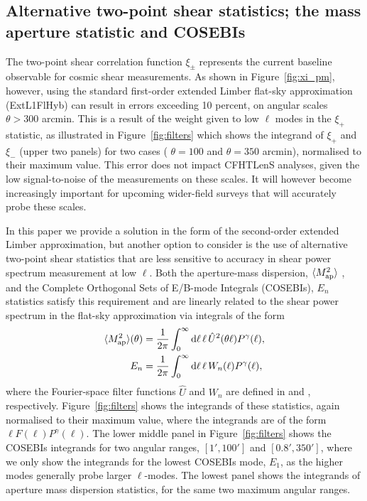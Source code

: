 \subsection{Alternative two-point shear statistics; the mass aperture statistic
and COSEBIs}

The two-point shear correlation function $\xi_\pm$ represents the current
baseline observable for cosmic shear measurements.   As shown in
Figure~\ref{fig:xi_pm}, however, using the standard first-order extended
Limber flat-sky approximation (ExtL1FlHyb) can result in errors exceeding 10
percent, on angular scales $\theta > 300$ arcmin.    This is a result of the
weight given to low $\ell$ modes in the $\xi_+$ statistic, as
illustrated in Figure~\ref{fig:filters} which shows the integrand of $\xi_+$
and $\xi_-$ (upper two panels) for two cases ( $\theta = 100$ and $\theta =
350$ arcmin), normalised to their maximum value.   This error does not impact
CFHTLenS analyses, given the low signal-to-noise of the measurements on these
scales.  It will however become increasingly important for upcoming wider-field
surveys that will accurately probe these scales.

In this paper we provide a solution in the form of the second-order extended
Limber approximation, but another option to consider is the use of alternative two-point
shear statistics that are less sensitive to accuracy in shear power spectrum
measurement at low $\ell$.   Both the aperture-mass dispersion, $\langle M_
{\rm ap}^2 \rangle$ \citep{1998MNRAS.296..873S}, and the Complete Orthogonal
Sets of E/B-mode Integrals (COSEBIs), $E_n$ \citep{COSEBIs} statistics satisfy
this requirement and are linearly related to the shear power spectrum in the
flat-sky approximation via integrals of the form 
%
\begin{align}
  \langle M_ {\rm ap}^2 \rangle(\theta) & = \frac 1 {2\pi} \int_0^{\infty}{\rm d} \ell \, \ell \,
  \hat U^2(\theta\ell) P^\gamma(\ell),
  \label{eqn:integ}
  \\
  E_n & = \frac 1 {2\pi} \int_0^{\infty}{\rm d} \ell \, \ell \, W_n(\ell) P^\gamma(\ell),
\end{align}
%
where the Fourier-space filter functions $\hat U$ and $W_n$ are defined in
\cite{1998MNRAS.296..873S} and \cite{COSEBIs}, respectively.
Figure~\ref{fig:filters} shows the integrands of these statistics, again
normalised to their maximum value, where the integrands are of the form $\ell
F(\ell) P^\gamma(\ell)$.  The lower middle panel in Figure~\ref{fig:filters}
shows the COSEBIs integrands for two angular ranges, $[1',100']$ and
$[0.8',350']$, where we only show the integrands for the lowest COSEBIs mode,
$E_1$, as the higher modes generally probe larger $\ell$-modes.  The lowest
panel shows the integrands of aperture mass dispersion statistics, for the same
two maximum angular ranges. 

